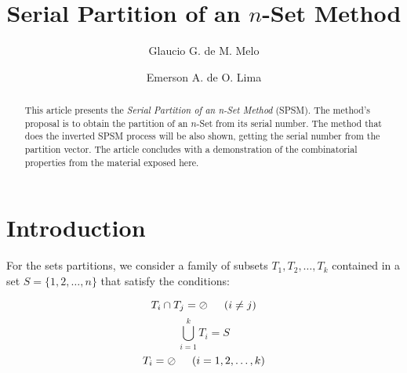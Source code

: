 \documentclass {amsart}
\newcommand{\emerson}{Emerson A. de O. Lima}
\newcommand{\glaucio}{Glaucio G. de M. Melo}
\begin{document}
\title[Serial Partition of an {$n$}-Set Method]
 {Serial Partition of an {$n$}-Set Method}

\author[Melo]{\glaucio}
\address[Melo]{Departamento de Estat\'{\i}stica e Inform\'{a}tica - UNICAP}

\author[Oliveira-Lima]{\emerson}
\address[Oliveira-Lima]{Departamento de Estat\'{\i}stica e Inform\'{a}tica - UNICAP}


\begin{abstract}
This article presents the \emph{Serial Partition of an n-Set
Method} (SPSM). The method's proposal is to obtain the partition
of an {$n$}-Set from its serial number. The method that does the
inverted SPSM process will be also shown, getting the serial
number from the partition vector. The article concludes with a
demonstration of the combinatorial properties from the material
exposed here.
\end{abstract}
\maketitle
\section*{Introduction}

For the sets partitions, we consider a family of subsets {$T_1,
T_2,\ldots,T_k $} contained in a set {$S = \{1,2,\ldots,n\}$} that
satisfy the conditions:

\begin{equation}
T_i \cap T_j = \oslash \indent (i \neq j)
\end{equation}
\begin{equation}
\bigcup _{i=1}^{k} T_i = S
\end{equation}
\begin{equation}
T_i = \oslash \indent (i = 1, 2, \ldots,k)
\end{equation}
\end{document}

